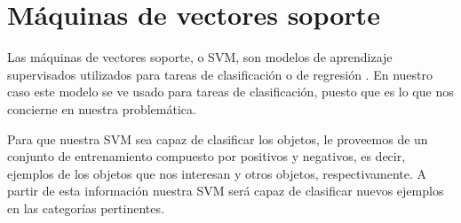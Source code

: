 \section{Máquinas de vectores soporte}

Las máquinas de vectores soporte, o SVM, son modelos de aprendizaje supervisados utilizados para tareas de clasificación o de regresión \cite{wiki:svm}. En nuestro caso este modelo se ve usado para tareas de clasificación, puesto que es lo que nos concierne en nuestra problemática.

Para que nuestra SVM sea capaz de clasificar los objetos, le proveemos de un conjunto de entrenamiento compuesto por positivos y negativos, es decir, ejemplos de los objetos que nos interesan y otros objetos, respectivamente. A partir de esta información nuestra SVM será capaz de clasificar nuevos ejemplos en las categorías pertinentes.